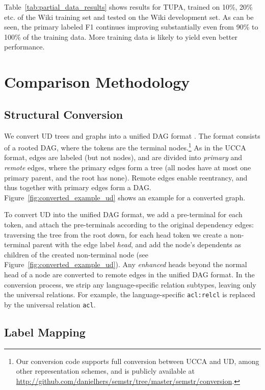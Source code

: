 \documentclass[11pt,a4paper]{article}
\begin{document}
Table~\ref{tab:partial_data_results} shows results for TUPA,
trained on 10\%, 20\% etc. of the Wiki training set and tested on the Wiki development set.
As can be seen, the primary labeled F1 continues improving substantially even from 90\% to 100\%
of the training data. More training data is likely to yield even better performance.

\section{Comparison Methodology}\label{sec:conversion}

\subsection{Structural Conversion}\label{sec:structural}

We convert UD trees and graphs into a unified DAG format \cite{hershcovich2018multitask,hershcovich2018universal}.
The format consists of a rooted DAG, where the tokens are the terminal
nodes.\footnote{Our conversion code supports full conversion between UCCA and UD,
among other representation schemes,
and is publicly available at \url{http://github.com/danielhers/semstr/tree/master/semstr/conversion}.}
As in the UCCA format, edges are labeled (but not nodes),
and are divided into \textit{primary} and \textit{remote} edges,
where the primary edges form a tree (all nodes have at most one primary parent,
and the root has none).
Remote edges enable reentrancy, and thus together with primary edges
form a DAG.
Figure~\ref{fig:converted_example_ud} shows an example for a converted graph.

To convert UD into the unified DAG format,
we add a pre-terminal for each token,
and attach the pre-terminals according to the original dependency edges:
traversing the tree from the root down, for each head token we create a non-terminal
parent with the edge label {\it head},
and add the node's dependents as children of the created non-terminal node
(see Figure~\ref{fig:converted_example_ud}).
Any \textit{enhanced}
heads beyond the normal head of a node are converted to remote edges in the unified DAG format.
In the conversion process, we strip any language-specific relation subtypes,
leaving only the universal relations.
For example, the language-specific \verb|acl:relcl| is replaced by the universal relation \verb|acl|.



\subsection{Label Mapping}\label{sec:mapping}
\end{document}
